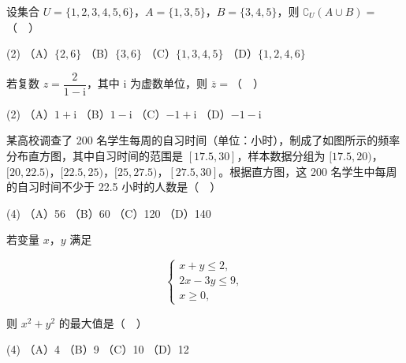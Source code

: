 \begin{question}
设集合 \(U=\{1,2,3,4,5,6\}\)，\(A=\{1,3,5\}\)，\(B=\{3,4,5\}\)，则 \(\complement_U(A\cup B)=\)（　）

\begin{gkopts}(2)
\task （A）\(\{2,6\}\)
\task （B）\(\{3,6\}\)
\task （C）\(\{1,3,4,5\}\)
\task （D）\(\{1,2,4,6\}\)
\end{gkopts}

\end{question}
\begin{question}
若复数 \(z=\dfrac{2}{1-\mathrm{i}}\)，其中 \(\mathrm{i}\) 为虚数单位，则 \(\overline{z}=\)（　）

\begin{gkopts}(2)
\task （A）\(1+\mathrm{i}\)
\task （B）\(1-\mathrm{i}\)
\task （C）\(-1+\mathrm{i}\)
\task （D）\(-1-\mathrm{i}\)
\end{gkopts}

\Needspace{0.4\textheight}
\end{question}
\begin{question}
某高校调查了 200 名学生每周的自习时间（单位：小时），制成了如图所示的频率分布直方图，其中自习时间的范围是 \([17.5,30]\)，样本数据分组为 \([17.5,20)\)，\([20,22.5)\)，\([22.5,25)\)，\([25,27.5)\)，\([27.5,30]\)。根据直方图，这 200 名学生中每周的自习时间不少于 22.5 小时的人数是（　）
\nopagebreak[4]
\begin{center}\end{center}
\nopagebreak[4]
\begin{gkopts}(4)
\task （A）56
\task （B）60
\task （C）120
\task （D）140
\end{gkopts}

\end{question}
\begin{question}
若变量 \(x\)，\(y\) 满足

\nopagebreak[4]
\[
\begin{cases}
x+y\leqslant 2,\\
2x-3y\leqslant 9,\\
x\geqslant 0,
\end{cases}
\]

则 \(x^2+y^2\) 的最大值是（　）

\begin{gkopts}(4)
\task （A）4
\task （B）9
\task （C）10
\task （D）12
\end{gkopts}

\Needspace{0.4\textheight}
\end{question}
